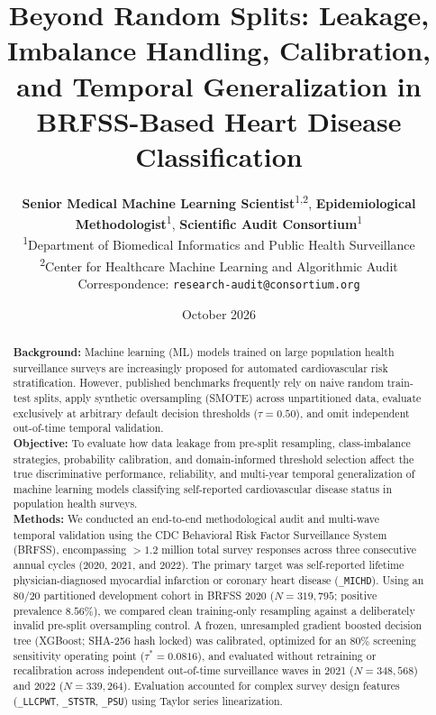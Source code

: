 \documentclass[11pt,a4paper]{article}
\title{\textbf{Beyond Random Splits: Leakage, Imbalance Handling, Calibration, and Temporal Generalization in BRFSS-Based Heart Disease Classification}}
\author{
  \textbf{Senior Medical Machine Learning Scientist}\textsuperscript{1,2}, 
  \textbf{Epidemiological Methodologist}\textsuperscript{1}, 
  \textbf{Scientific Audit Consortium}\textsuperscript{1} \\
  \small \textsuperscript{1}Department of Biomedical Informatics and Public Health Surveillance \\
  \small \textsuperscript{2}Center for Healthcare Machine Learning and Algorithmic Audit \\
  \small Correspondence: \texttt{research-audit@consortium.org}
}
\date{October 2026}
\begin{document}
\maketitle

\begin{abstract}
\noindent \textbf{Background:} Machine learning (ML) models trained on large population health surveillance surveys are increasingly proposed for automated cardiovascular risk stratification. However, published benchmarks frequently rely on naive random train-test splits, apply synthetic oversampling (SMOTE) across unpartitioned data, evaluate exclusively at arbitrary default decision thresholds ($\tau = 0.50$), and omit independent out-of-time temporal validation. \\
\textbf{Objective:} To evaluate how data leakage from pre-split resampling, class-imbalance strategies, probability calibration, and domain-informed threshold selection affect the true discriminative performance, reliability, and multi-year temporal generalization of machine learning models classifying self-reported cardiovascular disease status in population health surveys. \\
\textbf{Methods:} We conducted an end-to-end methodological audit and multi-wave temporal validation using the CDC Behavioral Risk Factor Surveillance System (BRFSS), encompassing $>1.2$ million total survey responses across three consecutive annual cycles (2020, 2021, and 2022). The primary target was self-reported lifetime physician-diagnosed myocardial infarction or coronary heart disease (\texttt{\_MICHD}). Using an 80/20 partitioned development cohort in BRFSS 2020 ($N = 319,795$; positive prevalence $8.56\%$), we compared clean training-only resampling against a deliberately invalid pre-split oversampling control. A frozen, unresampled gradient boosted decision tree (XGBoost; SHA-256 hash locked) was calibrated, optimized for an $80\%$ screening sensitivity operating point ($\tau^* = 0.0816$), and evaluated without retraining or recalibration across independent out-of-time surveillance waves in 2021 ($N = 348,568$) and 2022 ($N = 339,264$). Evaluation accounted for complex survey design features (\texttt{\_LLCPWT}, \texttt{\_STSTR}, \texttt{\_PSU}) using Taylor series linearization. \\

\end{abstract}
\end{document}
